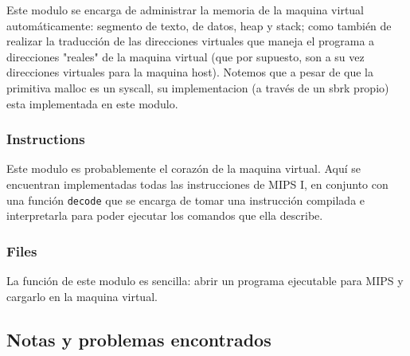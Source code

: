 \documentclass[12pt]{article}
\begin{document}
Este modulo se encarga de administrar la memoria de la maquina virtual automáticamente: segmento de texto, de datos, heap y stack; como también de realizar la traducción de las direcciones virtuales que maneja el programa a direcciones "reales" de la maquina virtual (que por supuesto, son a su vez direcciones virtuales para la maquina host). Notemos que a pesar de que la primitiva malloc es un syscall, su implementacion (a través de un sbrk propio) esta implementada en este modulo.

\subsubsection{Instructions}

Este modulo es probablemente el corazón de la maquina virtual. Aquí se encuentran implementadas todas las instrucciones de MIPS I, en conjunto con una función \texttt{decode} que se encarga de tomar una instrucción compilada e interpretarla para poder ejecutar los comandos que ella describe. 

\subsubsection{Files}

La función de este modulo es sencilla: abrir un programa ejecutable para MIPS y cargarlo en la maquina virtual.


\subsection{Notas y problemas encontrados}
\end{document}
